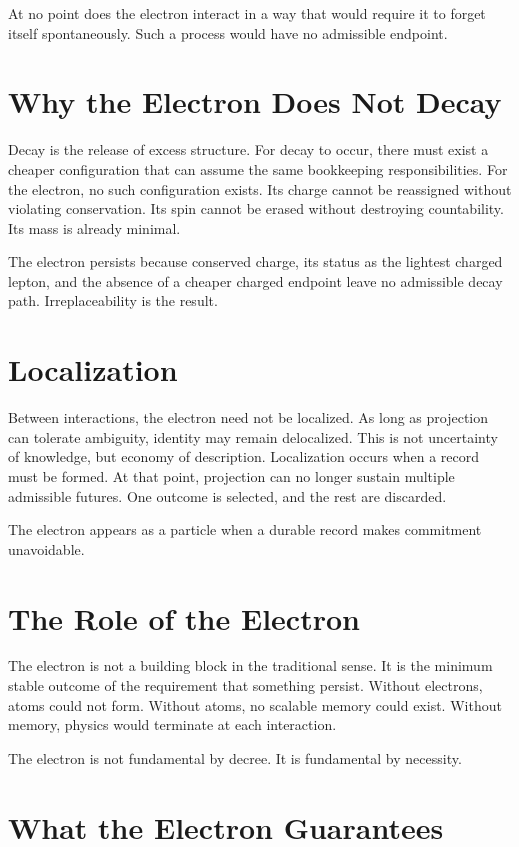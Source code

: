 \documentclass[11pt,twoside,openright]{book}
\begin{document}
At no point does the electron interact in a way that would require it to forget itself spontaneously. Such a process would have no admissible endpoint.

\section*{Why the Electron Does Not Decay}

Decay is the release of excess structure. For decay to occur, there must exist a cheaper configuration that can assume the same bookkeeping responsibilities. For the electron, no such configuration exists. Its charge cannot be reassigned without violating conservation. Its spin cannot be erased without destroying countability. Its mass is already minimal.

The electron persists because conserved charge, its status as the lightest charged lepton, and the absence of a cheaper charged endpoint leave no admissible decay path. Irreplaceability is the result.

\section*{Localization}

Between interactions, the electron need not be localized. As long as projection can tolerate ambiguity, identity may remain delocalized. This is not uncertainty of knowledge, but economy of description. Localization occurs when a record must be formed. At that point, projection can no longer sustain multiple admissible futures. One outcome is selected, and the rest are discarded.

The electron appears as a particle when a durable record makes commitment unavoidable.

\section*{The Role of the Electron}

The electron is not a building block in the traditional sense. It is the minimum stable outcome of the requirement that something persist. Without electrons, atoms could not form. Without atoms, no scalable memory could exist. Without memory, physics would terminate at each interaction.

The electron is not fundamental by decree. It is fundamental by necessity.

\section*{What the Electron Guarantees}
\end{document}

